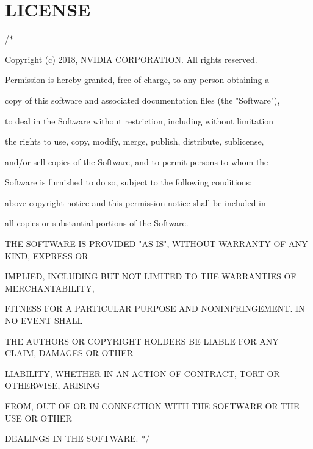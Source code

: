 \chapter{LICENSE }
\hypertarget{md_jetson-inference_2utils_2_l_i_c_e_n_s_e}{}\label{md_jetson-inference_2utils_2_l_i_c_e_n_s_e}
/\+\texorpdfstring{$\ast$}{*}
\begin{DoxyItemize}
\item Copyright (c) 2018, NVIDIA CORPORATION. All rights reserved.
\item 
\item Permission is hereby granted, free of charge, to any person obtaining a
\item copy of this software and associated documentation files (the "{}\+Software"{}),
\item to deal in the Software without restriction, including without limitation
\item the rights to use, copy, modify, merge, publish, distribute, sublicense,
\item and/\+or sell copies of the Software, and to permit persons to whom the
\item Software is furnished to do so, subject to the following conditions:\+
\item 
\item {} above copyright notice and this permission notice shall be included in
\item all copies or substantial portions of the Software.
\item 
\item THE SOFTWARE IS PROVIDED "{}\+AS IS"{}, WITHOUT WARRANTY OF ANY KIND, EXPRESS OR
\item IMPLIED, INCLUDING BUT NOT LIMITED TO THE WARRANTIES OF MERCHANTABILITY,
\item FITNESS FOR A PARTICULAR PURPOSE AND NONINFRINGEMENT. IN NO EVENT SHALL
\item THE AUTHORS OR COPYRIGHT HOLDERS BE LIABLE FOR ANY CLAIM, DAMAGES OR OTHER
\item LIABILITY, WHETHER IN AN ACTION OF CONTRACT, TORT OR OTHERWISE, ARISING
\item FROM, OUT OF OR IN CONNECTION WITH THE SOFTWARE OR THE USE OR OTHER
\item DEALINGS IN THE SOFTWARE. \texorpdfstring{$\ast$}{*}/\+ 
\end{DoxyItemize}